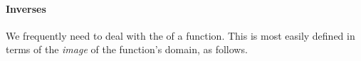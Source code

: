 \paragraph*{Inverses}
We frequently need to deal with the  of a function. This is most easily defined in terms of the
\emph{image} of the function's domain, as follows.

\begin{code}%
\>[0]\<%
\\
\>[0]\AgdaSpace{}%
\AgdaModule{\AgdaUnderscore{}}\AgdaSpace{}%
\AgdaSymbol{\{}\AgdaSpace{}%
\AgdaSymbol{:}\AgdaSpace{}%
\AgdaSpace{}%
\AgdaSpace{}%
\AgdaSymbol{\}\{}\AgdaSpace{}%
\AgdaSymbol{:}\AgdaSpace{}%
\AgdaSpace{}%
\AgdaSpace{}%
\AgdaSymbol{\}}\AgdaSpace{}%
\<%
\\
\>[0][@{}l@{\AgdaIndent{0}}]%
\>[1]\AgdaSpace{}%
\AgdaSpace{}%
\AgdaSpace{}%
\AgdaSpace{}%
\AgdaSymbol{(}\AgdaSpace{}%
\AgdaSpace{}%
\AgdaSymbol{;}\AgdaSpace{}%
\AgdaSpace{}%
\AgdaSymbol{)}\AgdaSpace{}%
\AgdaSpace{}%
\AgdaSymbol{(}\AgdaSpace{}%
\AgdaSpace{}%
\AgdaSpace{}%
\AgdaSpace{}%
\AgdaSymbol{)}\<%
\\
%
\\[\AgdaEmptyExtraSkip]%
%
\>[1]\AgdaSpace{}%
\AgdaSpace{}%
\AgdaSymbol{(}\AgdaSpace{}%
\AgdaSymbol{:}\AgdaSpace{}%
\AgdaSpace{}%
\AgdaSpace{}%
\AgdaSymbol{)}\AgdaSpace{}%
\AgdaSymbol{:}\AgdaSpace{}%
\AgdaSpace{}%
\AgdaSpace{}%
\AgdaSpace{}%
\AgdaSymbol{(}\AgdaSpace{}%
\AgdaSpace{}%
\AgdaSpace{}%
\AgdaSpace{}%
\AgdaSymbol{)}\AgdaSpace{}%
\<%
\\
\>[1][@{}l@{\AgdaIndent{0}}]%
\>[2]\AgdaSpace{}%
\AgdaSymbol{:}\AgdaSpace{}%
\AgdaSymbol{\{}\AgdaSpace{}%
\AgdaSymbol{:}\AgdaSpace{}%
\AgdaSymbol{\}}\AgdaSpace{}%
\AgdaSpace{}%
\AgdaSpace{}%
\AgdaSpace{}%
\AgdaSpace{}%
\AgdaSpace{}%
\AgdaSpace{}%
\AgdaSpace{}%
\AgdaSpace{}%
\AgdaSpace{}%
\AgdaSpace{}%
\AgdaSpace{}%
\AgdaSpace{}%
\AgdaSpace{}%
\<%
\\
\>[0]\<%
\end{code}

